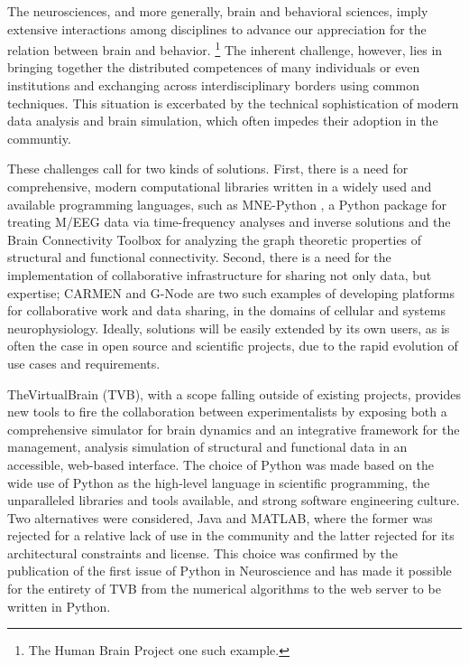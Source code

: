 The neurosciences, and more generally, brain and behavioral sciences, imply
extensive interactions among disciplines to advance our 
appreciation for the relation between brain and behavior. 
\footnote{The Human Brain Project one such example.} 
The inherent challenge, however, lies in bringing together the distributed competences
of many individuals or even institutions and exchanging across interdisciplinary
borders using common techniques.  
This situation is excerbated by the technical sophistication of modern
data analysis and brain simulation, which often impedes their adoption 
in the communtiy.

These challenges call for two kinds of solutions. First, there is a need
for comprehensive, modern computational libraries written in a widely
used and available programming languages, such as MNE-Python \cite{mnepython},
a Python package for treating M/EEG data via time-frequency analyses and inverse
solutions and the Brain Connectivity
Toolbox \cite{rubinov2010complex} for analyzing the graph theoretic
properties of structural and functional connectivity. Second, there is
a need for the implementation
of collaborative infrastructure for sharing not only data, but expertise; 
CARMEN \cite{austin2011carmen} and G-Node \cite{herz2008g} are two such
examples of developing platforms for collaborative work and data sharing, 
in the domains of cellular and systems neurophysiology.
Ideally, solutions will be easily extended by its own users, as is often
the case in open source and scientific projects, due to the rapid 
evolution of use cases and requirements.

TheVirtualBrain (TVB), with a scope falling outside of existing projects,
provides new tools to fire the collaboration between experimentalists by
exposing both a comprehensive simulator for brain dynamics and an integrative 
framework for the management, analysis simulation of structural and functional
data in an accessible, web-based interface. The choice of Python was made based on
the wide use of Python as the high-level language in scientific programming, 
the unparalleled libraries and tools available, and strong software engineering 
culture.
Two alternatives were considered, Java
and MATLAB, where the former was rejected for a relative lack of use in the community
and the latter rejected for its architectural constraints and license. 
This choice was confirmed by the publication of the first issue of Python 
in Neuroscience and has made it possible for the entirety of TVB from the 
numerical algorithms to the web server to be written in Python.

